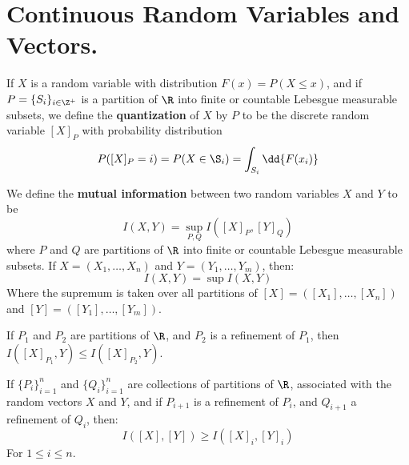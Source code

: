 
\section{Continuous Random Variables and Vectors.}
\label{section1}

\begin{definition}
    If $X$ is a random variable with distribution  $F(x)=P(X \leq x)$, and if
    $P=\{S_i\}_{i \in \Z^+}$ is a partition of $\R$ into finite or countable
    Lebesgue measurable subsets, we define the \textbf{quantization} of $X$ by
    $P$ to be the discrete random variable $[X]_P$ with probability distribution
    \begin{equation}
        P([X]_P=i)=P(X \in \S_i)=\int_{S_i}{\dd{F(x_i)}}
    \end{equation}
\end{definition}

\begin{definition}
    We define the \textbf{mutual information} between two random variables $X$
    and  $Y$ to be
    \begin{equation}
        I(X,Y)=\sup_{P,Q}{I([X]_P,[Y]_Q)}
    \end{equation}
    where $P$ and  $Q$ are partitions of  $\R$ into finite or countable Lebesgue
    measurable subsets. If  $X=(X_1, \dots, X_n)$ and $Y=(Y_1, \dots, Y_m)$,
    then:
    \begin{equation}
        I(X,Y)=\sup{I(X,Y)}
    \end{equation}
    Where the supremum is taken over all partitions of $[X]=([X_1], \dots,
    [X_n])$ and $[Y]=([Y_1], \dots, [Y_m])$.
\end{definition}

\begin{lemma}\label{2.3.1}
    If $P_1$ and $P_2$ are partitions of $\R$, and  $P_2$ is a refinement of
    $P_1$, then $I([X]_{P_1},Y) \leq I([X]_{P_2},Y)$.
\end{lemma}
\begin{corollary}
    If $\{P_i\}_{i=1}^n$ and $\{Q_i\}_{i=1}^n$ are collections of partitions of
    $\R$, associated with the random vectors $X$ and $Y$, and if  $P_{i+1}$ is a
    refinement of $P_i$, and  $Q_{i+1}$ a refinement of $Q_i$, then:
    \begin{equation}
        I([X],[Y]) \geq I([X]_i,[Y]_i)
    \end{equation}
    For $1 \leq i \leq n$.
\end{corollary}


